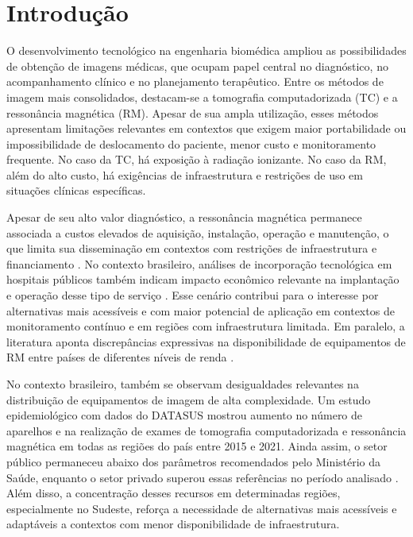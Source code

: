 
\chapter{Introdução}

O desenvolvimento tecnológico na engenharia biomédica ampliou as possibilidades de obtenção de imagens médicas, que ocupam papel central no diagnóstico, no acompanhamento clínico e no planejamento terapêutico. Entre os métodos de imagem mais consolidados, destacam-se a tomografia computadorizada (TC) e a ressonância magnética (RM). Apesar de sua ampla utilização, esses métodos apresentam limitações relevantes em contextos que exigem maior portabilidade ou impossibilidade de deslocamento do paciente, menor custo e monitoramento frequente. No caso da TC, há exposição à radiação ionizante. No caso da RM, além do alto custo, há exigências de infraestrutura e restrições de uso em situações clínicas específicas.

Apesar de seu alto valor diagnóstico, a ressonância magnética permanece associada a custos elevados de aquisição, instalação, operação e manutenção, o que limita sua disseminação em contextos com restrições de infraestrutura e financiamento \cite{Gulani2025}. No contexto brasileiro, análises de incorporação tecnológica em hospitais públicos também indicam impacto econômico relevante na implantação e operação desse tipo de serviço \cite{Silva2013}. Esse cenário contribui para o interesse por alternativas mais acessíveis e com maior potencial de aplicação em contextos de monitoramento contínuo e em regiões com infraestrutura limitada. Em paralelo, a literatura aponta discrepâncias expressivas na disponibilidade de equipamentos de RM entre países de diferentes níveis de renda \cite{MRI_LMICs}.

No contexto brasileiro, também se observam desigualdades relevantes na distribuição de equipamentos de imagem de alta complexidade. Um estudo epidemiológico com dados do DATASUS mostrou aumento no número de aparelhos e na realização de exames de tomografia computadorizada e ressonância magnética em todas as regiões do país entre 2015 e 2021. Ainda assim, o setor público permaneceu abaixo dos parâmetros recomendados pelo Ministério da Saúde, enquanto o setor privado superou essas referências no período analisado \cite{TC_RM_Brasil}. Além disso, a concentração desses recursos em determinadas regiões, especialmente no Sudeste, reforça a necessidade de alternativas mais acessíveis e adaptáveis a contextos com menor disponibilidade de infraestrutura.


